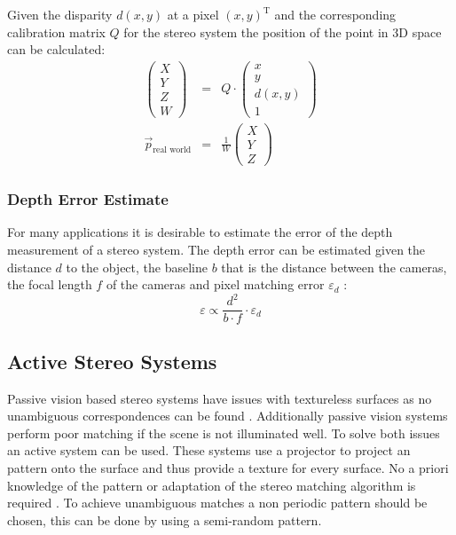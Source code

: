 Given the disparity $d(x,y)$ at a pixel ${(x,y)}^\text{T}$ and the corresponding calibration matrix $Q$ for the stereo system the position of the point in 3D space can be calculated:
\begin{eqnarray}
    \begin{pmatrix} 
        X \\ Y \\ Z \\ W
    \end{pmatrix}
    &=& Q \cdot 
    \begin{pmatrix}
        x \\ y \\ d(x,y) \\ 1
    \end{pmatrix} \\
    \vec{p}_\text{real world} &=& 
    \frac{1}{W}
    \begin{pmatrix}
        X \\ Y \\ Z
    \end{pmatrix}
\end{eqnarray}

\subsubsection{Depth Error Estimate} \label{sec:theo:error}
For many applications it is desirable to estimate the error of the depth measurement of a stereo system.
The depth error can be estimated given the distance $d$ to the object, the baseline $b$ that is the distance between the cameras, the focal length $f$ of the cameras and pixel matching error $\varepsilon_d$ \cite{stereoError}:
\begin{equation}
    \varepsilon \propto \frac{d^2}{b\cdot f} \cdot \varepsilon_d
\end{equation}

\subsection{Active Stereo Systems}
Passive vision based stereo systems have issues with textureless surfaces as no unambiguous correspondences can be found \cite{d435Structured}.
Additionally passive vision systems perform poor matching if the scene is not illuminated well.
To solve both issues an active system can be used. 
These systems use a projector to project an pattern onto the surface and thus provide a texture for every surface.
No a priori knowledge of the pattern or adaptation of the stereo matching algorithm is required \cite{d435Structured}.
To achieve unambiguous matches a non periodic pattern should be chosen, this can be done by using a semi-random pattern.


